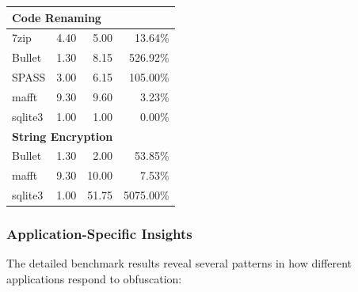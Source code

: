 \documentclass[conference]{IEEEtran}
\begin{document}
\begin{table}[ht!]
\begin{tabular}{|l|r|r|r|}
\hline
\multicolumn{4}{|l|}{\textbf{Code Renaming}} \\
\hline
7zip & 4.40 & 5.00 & 13.64\% \\
Bullet & 1.30 & 8.15 & 526.92\% \\
SPASS & 3.00 & 6.15 & 105.00\% \\
mafft & 9.30 & 9.60 & 3.23\% \\
sqlite3 & 1.00 & 1.00 & 0.00\% \\
\hline
\multicolumn{4}{|l|}{\textbf{String Encryption}} \\
\hline
Bullet & 1.30 & 2.00 & 53.85\% \\
mafft & 9.30 & 10.00 & 7.53\% \\
sqlite3 & 1.00 & 51.75 & 5075.00\% \\
\hline
\end{tabular}
\label{tab:gcc-detailed-results}
\end{table}

\subsubsection{Application-Specific Insights}
The detailed benchmark results reveal several patterns in how different applications respond to obfuscation:
\end{document}
